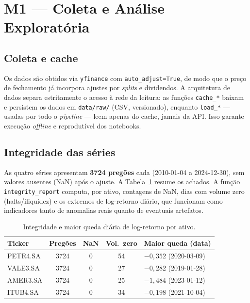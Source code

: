\section{M1 --- Coleta e Análise Exploratória}
\label{sec:m1}

\subsection{Coleta e cache}
Os dados são obtidos via \texttt{yfinance} com \texttt{auto\_adjust=True}, de modo que o
preço de fechamento já incorpora ajustes por \emph{splits} e dividendos. A arquitetura de
dados separa estritamente o acesso à rede da leitura: as funções \texttt{cache\_*} baixam
e persistem os dados em \texttt{data/raw/} (CSV, versionado), enquanto \texttt{load\_*}
--- usadas por todo o \emph{pipeline} --- leem apenas do cache, jamais da API. Isso garante
execução \emph{offline} e reprodutível dos notebooks.

\subsection{Integridade das séries}
As quatro séries apresentam \textbf{3724 pregões} cada (2010-01-04 a 2024-12-30), sem
valores ausentes (NaN) após o ajuste. A Tabela~\ref{tab:integridade} resume os achados.
A função \texttt{integrity\_report} computa, por ativo, contagens de NaN, dias com volume
zero (halts/iliquidez) e os extremos de log-retorno diário, que funcionam como
indicadores tanto de anomalias reais quanto de eventuais artefatos.

\begin{table}[h]
\centering
\caption{Integridade e maior queda diária de log-retorno por ativo.}
\label{tab:integridade}
\small
\begin{tabular}{lcccl}
\toprule
\textbf{Ticker} & \textbf{Pregões} & \textbf{NaN} & \textbf{Vol.\ zero} & \textbf{Maior queda (data)} \\
\midrule
PETR4.SA & 3724 & 0 & 54 & $-0{,}352$ (2020-03-09) \\
VALE3.SA & 3724 & 0 & 27 & $-0{,}282$ (2019-01-28) \\
AMER3.SA & 3724 & 0 & 25 & $-1{,}484$ (2023-01-12) \\
ITUB4.SA & 3724 & 0 & 34 & $-0{,}198$ (2021-10-04) \\
\bottomrule
\end{tabular}
\end{table}

